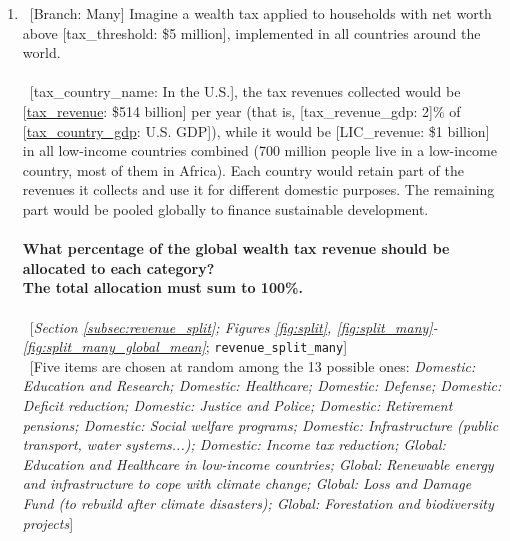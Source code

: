 \begin{enumerate}[resume]
\item ~[Branch: Many] \label{q:revenue_split_many} Imagine a wealth tax applied to households with net worth above [tax\_threshold: \$5 million], implemented in all countries around the world.
~\\\\ 
~[tax\_country\_name: In the U.S.], the tax revenues collected would be [\hyperlink{tab_features}{tax\_revenue}: \$514 billion] per year (that is, [tax\_revenue\_gdp: 2]\% of [\hyperlink{tab_features}{tax\_country\_gdp}: U.S. GDP]), while it would be [LIC\_revenue: \$1 billion] in all low-income countries combined (700 million people live in a low-income country, most of them in Africa).
Each country would retain part of the revenues it collects and use it for different domestic purposes. The remaining part would be pooled globally to finance sustainable development.
~\\\\\textbf{What percentage of the global wealth tax revenue should be allocated to each category?}~\\\textbf{The total allocation must sum to
100\%.}\\\\ 
~[\textit{Section \ref{subsec:revenue_split}; Figures \ref{fig:split}, \ref{fig:split_many}-\ref{fig:split_many_global_mean}}; 
\verb|revenue_split_many|]
  \\ ~[Five items are chosen at random among the 13 possible ones: \textit{Domestic: Education and Research; Domestic: Healthcare; Domestic: Defense; Domestic: Deficit reduction; Domestic: Justice and Police; Domestic: Retirement pensions; Domestic: Social welfare programs; Domestic: Infrastructure (public transport, water systems...); Domestic: Income tax reduction; Global: Education and Healthcare in low-income countries; Global: Renewable energy and infrastructure to cope with climate change; Global: Loss and Damage Fund (to rebuild after climate disasters); Global: Forestation and biodiversity projects}]


\end{enumerate} 

